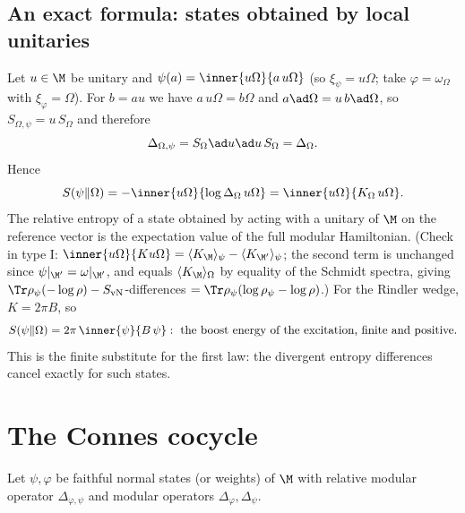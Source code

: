 \subsection*{An exact formula: states obtained by local unitaries}
Let $u\in\M$ be unitary and $\psi(a)=\inner{u\Omega}{a\,u\Omega}$ (so $\xi_\psi=u\Omega$; take $\varphi=\omega_\Omega$ with $\xi_\varphi=\Omega$). For $b=au$ we have $a\,u\Omega=b\Omega$ and $a\ad\Omega=u\,b\ad\Omega$, so $S_{\Omega,\psi}=u\,S_\Omega$ and therefore
\begin{equation}
\Delta_{\Omega,\psi}=S_\Omega\ad u\ad u\,S_\Omega=\Delta_\Omega.
\end{equation}
Hence
\begin{equation}
S(\psi\|\Omega)=-\inner{u\Omega}{\log\Delta_\Omega\,u\Omega}=\inner{u\Omega}{K_\Omega\,u\Omega}.
\end{equation}
The relative entropy of a state obtained by acting with a unitary of $\M$ on the reference vector is the expectation value of the full modular Hamiltonian. (Check in type I: $\inner{u\Omega}{K u\Omega}=\langle K_\M\rangle_\psi-\langle K_{\M'}\rangle_\psi$; the second term is unchanged since $\psi|_{\M'}=\omega|_{\M'}$, and equals $\langle K_\M\rangle_\Omega$ by equality of the Schmidt spectra, giving $\Tr\rho_\psi(-\log\rho)-S_{\rm vN}$-differences $=\Tr\rho_\psi(\log\rho_\psi-\log\rho)$.) For the Rindler wedge, $K=2\pi B$, so
\begin{equation}
S(\psi\|\Omega)=2\pi\,\inner{\psi}{B\,\psi}:\ \text{the boost energy of the excitation, finite and positive.}
\end{equation}
This is the finite substitute for the first law: the divergent entropy differences cancel exactly for such states.

\section{The Connes cocycle}

Let $\psi,\varphi$ be faithful normal states (or weights) of $\M$ with relative modular operator $\Delta_{\varphi,\psi}$ and modular operators $\Delta_\varphi,\Delta_\psi$.

